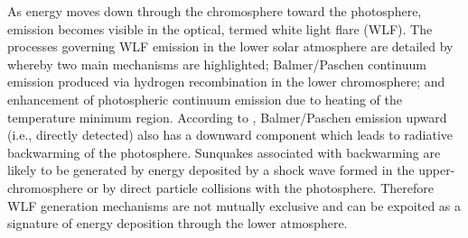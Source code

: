 As energy moves down through the chromosphere toward the photosphere, emission becomes visible in the optical, termed white light flare (WLF). The processes governing WLF emission in the lower solar atmosphere are detailed by \cite{2007ASPC..368..417D} whereby two main mechanisms are highlighted; Balmer/Paschen continuum emission produced via hydrogen recombination in the lower chromosphere; and enhancement of photospheric continuum emission due to heating of the temperature minimum region. According to \cite{1989SoPh..124..303M}, Balmer/Paschen emission upward (i.e., directly detected) also has a downward component which leads to radiative backwarming of the photosphere. Sunquakes associated with backwarming are likely to be generated by energy deposited by a shock wave formed in the upper-chromosphere or by direct particle collisions with the photosphere. Therefore WLF generation mechanisms are not mutually exclusive and can be expoited as a signature of energy deposition through the lower atmosphere.  



